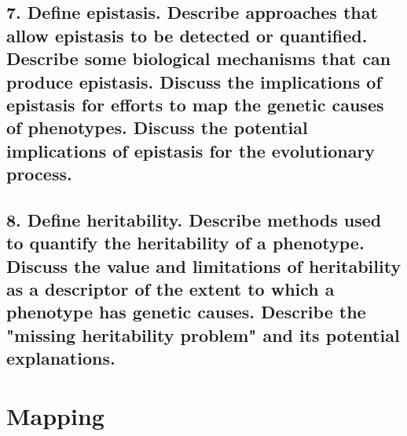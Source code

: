 \documentclass{tufte-handout}
\begin{document}
\subsection{7.
Define epistasis. Describe approaches that allow epistasis to be detected or quantified. Describe some biological mechanisms that can produce epistasis. Discuss the implications of epistasis for efforts to map the genetic causes of phenotypes. Discuss the potential implications of epistasis for the evolutionary process.}
\label{subsec:07}

\subsection{8.
Define heritability. Describe methods used to quantify the heritability of a phenotype. Discuss the value and limitations of heritability as a descriptor of the extent to which a phenotype has genetic causes. Describe the "missing heritability problem" and its potential explanations.}
\label{subsec:08}

\section{Mapping}\label{sec:map}
\end{document}
